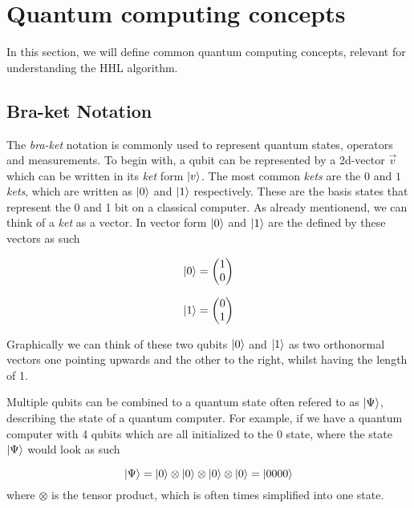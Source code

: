 \section{Quantum computing concepts}
In this section, we will define common quantum computing concepts, relevant for understanding the HHL algorithm.

\subsection{Bra-ket Notation}
The \textit{bra-ket} notation is commonly used to represent quantum states, operators and measurements.
To begin with, a qubit can be represented by a 2d-vector $\vec v$ which can be written in its \textit{ket} form $\ket v$.
The most common \textit{kets} are the $0$ and $1$ \textit{kets}, which are written as $\ket 0$ and $\ket 1$ respectively.
These are the basis states that represent the 0 and 1 bit on a classical computer. 
As already mentionend, we can think of a \textit{ket} as a vector. 
In vector form $\ket 0$ and $\ket 1$ are the defined by these vectors as such

\begin{equation}
  \ket 0  = \begin{pmatrix}1\\0\end{pmatrix} 
\end{equation}

\begin{equation}
  \ket 1  = \begin{pmatrix}0\\1\end{pmatrix}
\end{equation}

Graphically we can think of these two qubits $\ket 0$ and $\ket 1$ as two orthonormal vectors one pointing upwards and the other to the right, whilst having the length of 1.

Multiple qubits can be combined to a quantum state often refered to as $\ket \Psi$, describing the state of a quantum computer. 
For example, if we have a quantum computer with 4 qubits which are all initialized to the 0 state, where the state $\ket \Psi$ would look as such

\begin{equation}
    \ket \Psi = \ket 0 \otimes \ket 0 \otimes \ket 0 \otimes \ket 0 = \ket{0000}
\end{equation}
where $\otimes$ is the tensor product, which is often times simplified into one state.

